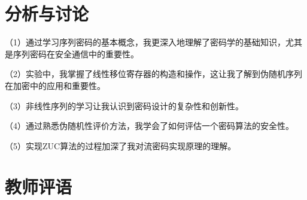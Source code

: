 \documentclass[a4paper,11pt,UTF8]{ctexart}
\begin{document}
      
\section{分析与讨论}
  （1）通过学习序列密码的基本概念，我更深入地理解了密码学的基础知识，尤其是序列密码在安全通信中的重要性。\par
  （2）实验中，我掌握了线性移位寄存器的构造和操作，这让我了解到伪随机序列在加密中的应用和重要性。\par
  （3）非线性序列的学习让我认识到密码设计的复杂性和创新性。\par
  （4）通过熟悉伪随机性评价方法，我学会了如何评估一个密码算法的安全性。\par
  （5）实现ZUC算法的过程加深了我对流密码实现原理的理解。\par

\section{教师评语}
\end{document}
